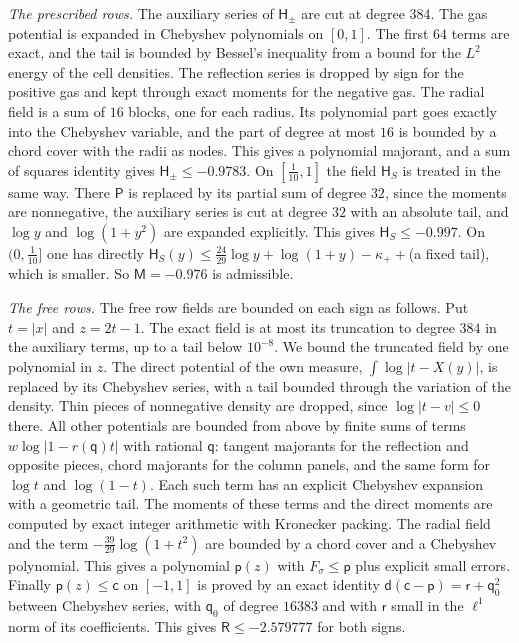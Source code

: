 \documentclass[11pt]{amsart}
\theoremstyle{definition}
\theoremstyle{remark}
\numberwithin{equation}{section}
\begin{document}
\emph{The prescribed rows.} The auxiliary series of $\mathsf H_\pm$ are cut at degree $384$. The gas potential is expanded in Chebyshev polynomials on $[0,1]$. The first $64$ terms are exact, and the tail is bounded by Bessel's inequality from a bound for the $L^2$ energy of the cell densities.
The reflection series is dropped by sign for the positive gas and kept through exact moments for the negative gas. The radial field is a sum of $16$ blocks, one for each radius. Its polynomial part goes exactly into the Chebyshev variable, and the part of degree at most $16$ is bounded by
a chord cover with the radii as nodes. This gives a polynomial majorant, and a sum of squares identity gives $\mathsf H_\pm\le-0.9783$. On $[\frac1{10},1]$ the field $\mathsf H_S$ is treated in the same way. There $\mathsf P$ is replaced by its partial sum of degree $32$, since the moments are nonnegative, the auxiliary series is cut at degree $32$ with an absolute tail, and
$\log y$ and $\log(1+y^2)$ are expanded explicitly. This gives $\mathsf H_S\le-0.997$. On $(0,\frac1{10}]$ one has directly $\mathsf H_S(y)\le\frac{24}{29}\log y+\log(1+y)-\kappa_++$(a fixed tail), which is smaller. So $\mathsf M=-0.976$ is admissible.

\emph{The free rows.} The free row fields are bounded on each sign as follows. Put $t=|x|$ and $z=2t-1$. The exact field is at most its truncation to degree $384$ in the auxiliary terms, up to a tail
below $10^{-8}$. We bound the truncated field by one polynomial in $z$. The direct potential of the own measure, $\int\log|t-X(y)|$, is replaced by its Chebyshev series,
with a tail bounded through the variation of the density. Thin pieces of nonnegative density are dropped, since $\log|t-v|\le0$ there. All other potentials
are bounded from above by finite sums of terms $w\log|1-r(\mathsf q)t|$ with rational $\mathsf q$: tangent majorants for the reflection and opposite pieces, chord majorants for the
column panels, and the same form for $\log t$ and $\log(1-t)$. Each such term has an explicit Chebyshev expansion with a geometric tail. The moments of these terms and the
direct moments are computed by exact integer arithmetic with Kronecker packing. The radial field and the term $-\frac{39}{29}\log(1+t^2)$ are bounded by a chord cover and a
Chebyshev polynomial. This gives a polynomial $\mathsf p(z)$ with $F_\sigma\le\mathsf p$ plus explicit small errors. Finally $\mathsf p(z)\le\mathsf c$ on $[-1,1]$ is proved by an exact identity
$\mathsf d(\mathsf c-\mathsf p)=\mathsf r+\mathsf q_0^2$ between Chebyshev series, with $\mathsf q_0$ of degree $16383$ and with $\mathsf r$ small in the $\ell^1$ norm of its coefficients. This gives
$\mathsf R\le-2.579777$ for both signs.
\end{document}
